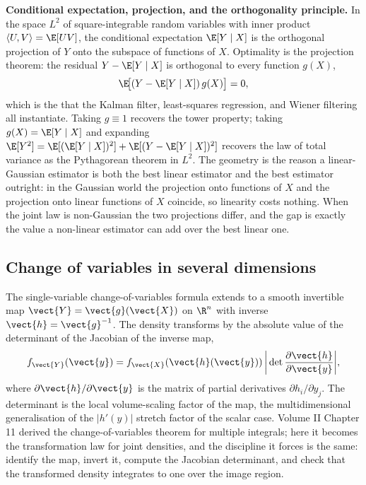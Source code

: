 \begin{mastery}
\textbf{Conditional expectation, projection, and the orthogonality
principle.} In the space $L^{2}$ of square-integrable random variables
with inner product $\langle U, V \rangle = \E[UV]$, the conditional
expectation $\E[Y \mid X]$ is the orthogonal projection of $Y$ onto the
subspace of functions of $X$. Optimality is the projection theorem: the
residual $Y - \E[Y \mid X]$ is orthogonal to every function $g(X)$,
\[
\E\!\big[(Y - \E[Y \mid X])\,g(X)\big] = 0,
\]
which is the  that the Kalman filter,
least-squares regression, and Wiener filtering all instantiate. Taking
$g \equiv 1$ recovers the tower property; taking $g(X) = \E[Y \mid X]$
and expanding $\E[Y^{2}] = \E[(\E[Y\mid X])^{2}] + \E[(Y - \E[Y\mid
X])^{2}]$ recovers the law of total variance as the Pythagorean theorem
in $L^{2}$. The geometry is the reason a linear-Gaussian estimator is
both the best linear estimator and the best estimator outright: in the
Gaussian world the projection onto functions of $X$ and the projection
onto linear functions of $X$ coincide, so linearity costs nothing. When
the joint law is non-Gaussian the two projections differ, and the gap is
exactly the value a non-linear estimator can add over the best linear
one.
\end{mastery}

\subsection{Change of variables in several dimensions}

The single-variable change-of-variables formula extends to a smooth
invertible map $\vect{Y} = \vect{g}(\vect{X})$ on $\R^{n}$ with inverse
$\vect{h} = \vect{g}^{-1}$. The density transforms by the absolute value
of the determinant of the Jacobian of the inverse map,
\[
f_{\vect{Y}}(\vect{y}) = f_{\vect{X}}(\vect{h}(\vect{y}))\,
\bigg| \det \frac{\partial \vect{h}}{\partial \vect{y}} \bigg|,
\]
where $\partial\vect{h}/\partial\vect{y}$ is the matrix of partial
derivatives $\partial h_{i}/\partial y_{j}$. The determinant is the
local volume-scaling factor of the map, the multidimensional
generalisation of the $|h'(y)|$ stretch factor of the scalar case.
Volume II Chapter 11 derived the change-of-variables theorem for
multiple integrals; here it becomes the transformation law for joint
densities, and the discipline it forces is the same: identify the map,
invert it, compute the Jacobian determinant, and check that the
transformed density integrates to one over the image region.

